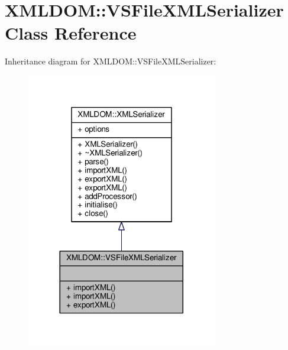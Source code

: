 \hypertarget{classXMLDOM_1_1VSFileXMLSerializer}{}\section{X\+M\+L\+D\+OM\+:\+:V\+S\+File\+X\+M\+L\+Serializer Class Reference}
\label{classXMLDOM_1_1VSFileXMLSerializer}


Inheritance diagram for X\+M\+L\+D\+OM\+:\+:V\+S\+File\+X\+M\+L\+Serializer\+:
\nopagebreak
\begin{figure}[H]
\begin{center}
\leavevmode
\includegraphics[width=236pt]{dc/d53/classXMLDOM_1_1VSFileXMLSerializer__inherit__graph}
\end{center}
\end{figure}


